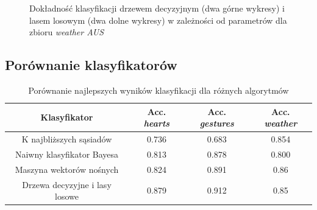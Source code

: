 \documentclass{classrep}
\begin{document}
{{\begin{figure}[h]
                \caption{Dokładność klasyfikacji drzewem decyzyjnym (dwa górne wykresy) i lasem losowym (dwa dolne wykresy) w zależności od parametrów dla zbioru \emph{weather AUS}}
                \label{trees_weather}
            \end{figure}
            \FloatBarrier
        }
        
        \subsection{Porównanie klasyfikatorów}
        \label{porownanie} {
            \begin{table}[h]
                \begin{tabular}{|c|c|c|c|} \hline
                    Klasyfikator & Acc. \emph{hearts} & Acc. \emph{gestures} & Acc. \emph{weather} \\ \hline
                    K najbliższych sąsiadów & 0.736 & 0.683 & 0.854 \\
                    Naiwny klasyfikator Bayesa & 0.813 & 0.878 & 0.800 \\
                    Maszyna wektorów nośnych & 0.824 & 0.891 & 0.86 \\
                    Drzewa decyzyjne i lasy losowe & 0.879 & 0.912 & 0.85 \\ \hline
                \end{tabular}
                \caption{Porównanie najlepszych wyników klasyfikacji dla różnych algorytmów}
            \end{table}
            \FloatBarrier
        }
    }
\end{document}
